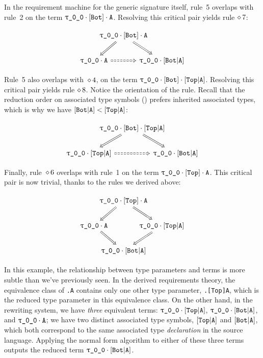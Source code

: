 \documentclass[../generics]{subfiles}
\begin{document}
\begin{example}
In the requirement machine for the generic signature itself, rule~5 overlaps with rule~2 on the term $\rT \cdot \protosym{Bot} \cdot \nA$. Resolving this critical pair yields rule $\diamond\, 7$:
\begin{ceqn}
\[
\begin{tikzcd}[column sep=-2em]
& \rT \cdot \protosym{Bot} \cdot \nA
\arrow[ld, Rightarrow]\arrow[rd, Rightarrow] \\
\rT \cdot \nA \arrow[rr, Rightarrow, dashed] && \rT \cdot \assocsym{Bot}{A}
\end{tikzcd}
\]
\end{ceqn}
Rule~5 also overlaps with~$\diamond\, 4$, on the term $\rT \cdot \protosym{Bot} \cdot \assocsym{Top}{A}$. Resolving this critical pair yields rule $\diamond\, 8$. Notice the orientation of the rule. Recall that the reduction order on associated type symbols () prefers inherited associated types, which is why we have $[\texttt{Bot}|\texttt{A}] < [\texttt{Top}|\texttt{A}]$:
\begin{ceqn}
\[
\begin{tikzcd}[column sep=-2.5em]
& \rT \cdot \protosym{Bot} \cdot \assocsym{Top}{A}
\arrow[ld, Rightarrow]\arrow[rd, Rightarrow] \\
\rT \cdot \assocsym{Top}{A} \arrow[rr, Rightarrow, dashed] && \rT \cdot \assocsym{Bot}{A}
\end{tikzcd}
\]
\end{ceqn}

Finally, rule~$\diamond\, 6$ overlaps with rule~1 on the term $\rT \cdot \protosym{Top} \cdot \nA$. This critical pair is now trivial, thanks to the rules we derived above:
\begin{ceqn}
\[
\begin{tikzcd}[column sep=-2em]
& \rT \cdot \protosym{Top} \cdot \nA
\arrow[ld, Rightarrow]\arrow[rd, Rightarrow] \\
\rT \cdot \nA \arrow[rd, Rightarrow] && \rT \cdot \assocsym{Top}{A}\arrow[ld, Rightarrow] \\
& \rT \cdot \assocsym{Bot}{A}
\end{tikzcd}
\]
\end{ceqn}

In this example, the relationship between type parameters and terms is more subtle than we've previously seen. In the derived requirements theory, the equivalence class of \texttt{\rT.A} contains only one other type parameter, \texttt{\rT.[Top]A}, which is the reduced type parameter in this equivalence class. On the other hand, in the rewriting system, we have \emph{three} equivalent terms: $\rT\cdot\assocsym{Top}{A}$, $\rT\cdot\assocsym{Bot}{A}$, and $\rT\cdot\nA$; we have two distinct associated type symbols, $[\texttt{Top}|\texttt{A}]$ and $[\texttt{Bot}|\texttt{A}]$, which both correspond to the same associated type \emph{declaration} in the source language. Applying the normal form algorithm to either of these three terms outputs the reduced term $\rT \cdot \assocsym{Bot}{A}$.


\end{example}
\end{document}
